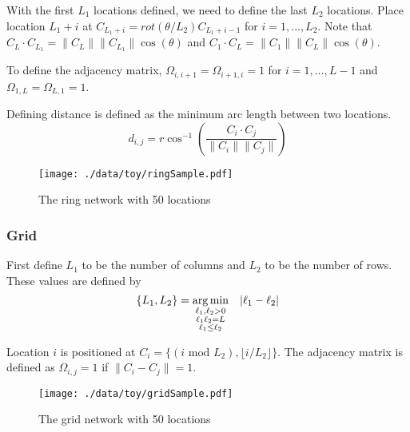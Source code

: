 \documentclass[11pt]{article}
\begin{document}
With the first $L_1$ locations defined, we need to define the last
$L_2$ locations.  Place location $L_1 + i$ at $C_{L_1 + i} =
    rot(\theta/L_2)C_{L_1 + i - 1}$ for $i = 1,\ldots,L_2$.  Note that
$C_{L} \cdot C_{L_1} = \|C_{L}\| \|C_{L_1}\| \cos(\theta)$ and $C_{1}
    \cdot C_{L} = \|C_{1}\| \|C_{L}\| \cos(\theta)$.

To define the adjacency matrix, $\Omega_{i,i+1} = \Omega_{i+1,i} = 1$ for $i =
    1,\ldots,L-1$ and $\Omega_{1,L} = \Omega_{L,1} = 1$.

Defining distance is defined as the minimum arc length between two
locations.
\begin{equation*}
  d_{i,j} = r\cos^{-1}\left(\frac{C_{i} \cdot
      C_{j}}{\|C_{i}\|\|C_{j}\|}\right)
\end{equation*}





\begin{figure}[htb]
\centering
\texttt{[image: ./data/toy/ringSample.pdf]}
\caption{\label{fig:ring50}The ring network with 50 locations}
\end{figure}




\subsubsection{Grid}
\label{sec-3-1-4}

First define $L_1$ to be the number of columns and $L_2$ to be the
number of rows.  These values are defined by
\begin{equation*}
  \lbrace L_1, L_2 \rbrace = \underset{
    \begin{subarray}{c}
      \ell_1,\ell_2 > 0\\
      \ell_1\ell_2 = L\\
      \ell_1 \le \ell_2
    \end{subarray}
  }{\arg\min} \quad |\ell_1 - \ell_2|
\end{equation*}

Location $i$ is positioned at $C_i = \lbrace (i \text{ mod } L_2), \lfloor
    i/L_2 \rfloor \rbrace$.  The adjacency matrix is defined as $\Omega_{i,j} =
    1$ if $\|C_i - C_j\| = 1$.

\begin{figure}[htb]
\centering
\texttt{[image: ./data/toy/gridSample.pdf]}
\caption{\label{fig:grid50}The grid network with 50 locations}
\end{figure}
\end{document}
